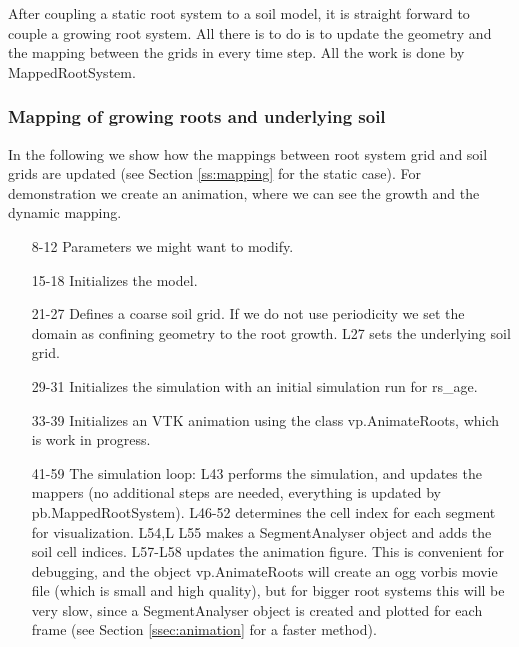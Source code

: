 

After coupling a static root system to a soil model, it is straight forward to couple a growing root system. All there is to do is to update the geometry and the mapping between the grids in every time step. All the work is done by MappedRootSystem.

    
\subsubsection*{Mapping of growing roots and underlying soil} 

In the following we show how the mappings between root system grid and soil grids are updated (see Section \ref{ss:mapping} for the static case). For demonstration we create an animation, where we can see the growth and the dynamic mapping. 



\begin{itemize}
\item[8-12] Parameters we might want to modify. 
\item[15-18] Initializes the model.
\item[21-27] Defines a coarse soil grid. If we do not use periodicity we set the domain as confining geometry to the root growth. L27 sets the underlying soil grid.
\item[29-31] Initializes the simulation with an initial simulation run for rs\_age.
\item[33-39] Initializes an VTK animation using the class vp.AnimateRoots, which is work in progress. 
\item[41-59] The simulation loop: L43 performs the simulation, and updates the mappers (no additional steps are needed, everything is updated by pb.MappedRootSystem). L46-52 determines the cell index for each segment for visualization. L54,L L55 makes a SegmentAnalyser object and adds the soil cell indices. L57-L58 updates the animation figure. This is convenient for debugging, and the object vp.AnimateRoots will create an ogg vorbis movie file (which is small and high quality), but for bigger root systems this will be very slow, since a SegmentAnalyser object is created and plotted for each frame (see Section \ref{ssec:animation} for a faster method).
\end{itemize}
